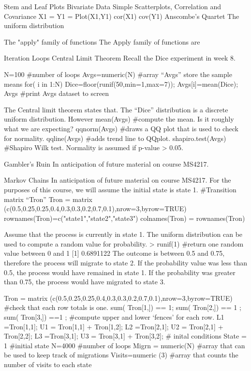 
Stem and Leaf Plots
Bivariate Data
Simple Scatterplots, Correlation and Covariance
X1 =
Y1 =
Plot(X1,Y1)
cor(X1)
cov(Y1)
Anscombe’s Quartet
The uniform distribution
 
 
The "apply" family of functions
The Apply family of functions are


Iteration Loops
Central Limit Theorem
Recall the Dice experiment in week 8.
 
N=100           	          	          	             #number of loops
Avgs=numeric(N)           	             #array “Avgs” store the sample means
for( i in 1:N)
              {              Dice=floor(runif(50,min=1,max=7));              Avgs[i]=mean(Dice);
              }
Avgs           	          	          	             #print Avgs dataset to screen
 
The Central limit theorem states that.
The “Dice” distribution is a discrete uniform distribution. However
mean(Avgs)           	          	             #compute the mean. Is it roughly what we are expecting?
qqnorm(Avgs)           	          	             #draws a QQ plot that is used to check for normality.
qqline(Avgs)           	          	             #adds trend line to QQplot.
shapiro.test(Avgs)           	             #Shapiro Wilk test. Normality is assumed if p-value > 0.05.
           	          	            

Gambler’s Ruin
In anticipation of future material on course MS4217.

Markov Chains
In anticipation of future material on course MS4217.
For the purposes of this course, we will assume the initial state is state 1.
#Transition matrix “Tron”
Tron = matrix (c(0.5,0.25,0.25,0.4,0.3,0.3,0.2,0.7,0.1),nrow=3,byrow=TRUE)
rownames(Tron)=c("state1","state2","state3")
colnames(Tron) = rownames(Tron)
 
Assume that the process is currently in state 1. The uniform distribution can be used to compute a random value for probability.
> runif(1)           	                           #return one random value between 0 and 1
[1] 0.6891122
The outcome is between 0.5 and 0.75, therefore the process will migrate to state 2. If the probability value was less than 0.5, the process would have remained in state 1. If the probability was greater than 0.75, the  process would have migrated to state 3.
 
Tron = matrix (c(0.5,0.25,0.25,0.4,0.3,0.3,0.2,0.7,0.1),nrow=3,byrow=TRUE)
#check that each row totals is one.
sum( Tron[1,]) == 1;                sum( Tron[2,]) == 1 ;               sum( Tron[3,]) ==1 ;
#compute upper and lower ‘fences’ for each row.
L1 =Tron[1,1];   	             U1 = Tron[1,1] + Tron[1,2];
L2 =Tron[2,1];   	             U2 = Tron[2,1] + Tron[2,2];
L3 =Tron[3,1];            	             U3 = Tron[3,1] + Tron[3,2];
# inital conditions
State = 1           	             #initial state
N=4000           	          	             #number of loops
Migrn = numeric(N)              #array that can be used to keep track of migrations
Visits=numeric (3)              #array that counts the number of visits to each state

